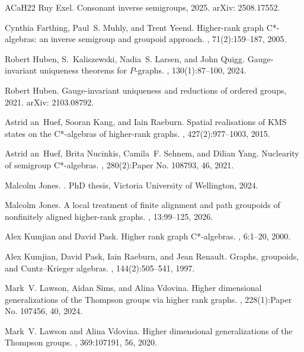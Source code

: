\documentclass[11pt]{amsart}
\theoremstyle{definition}
\numberwithin{thm}{section}
\numberwithin{equation}{section}
\begin{document}
\begin{thebibliography}{ACaH{\etalchar{+}}22}
Ruy Exel.
\newblock Consonant inverse semigroups, 2025.
\newblock arXiv: 2508.17552.

Cynthia Farthing, Paul~S. Muhly, and Trent Yeend.
\newblock Higher-rank graph {C}*-algebras: an inverse semigroup and groupoid approach.
, 71(2):159--187, 2005.

Robert Huben, S.~Kaliszewski, Nadia~S. Larsen, and John Quigg.
\newblock Gauge-invariant uniqueness theorems for {$P$}-graphs.
, 130(1):87--100, 2024.

Robert Huben.
\newblock Gauge-invariant uniqueness and reductions of ordered groups, 2021.
\newblock arXiv: 2103.08792.

Astrid an~Huef, Sooran Kang, and Iain Raeburn.
\newblock Spatial realisations of {KMS} states on the {C}*-algebras of higher-rank graphs.
, 427(2):977--1003, 2015.

Astrid an~Huef, Brita Nucinkis, Camila~F. Sehnem, and Dilian Yang.
\newblock Nuclearity of semigroup {C}*-algebras.
, 280(2):Paper No. 108793, 46, 2021.

Malcolm Jones.
.
\newblock PhD thesis, Victoria University of Wellington, 2024.

Malcolm Jones.
\newblock A local treatment of finite alignment and path groupoids of nonfinitely aligned higher-rank graphs.
, 13:99--125, 2026.

Alex Kumjian and David Pask.
\newblock Higher rank graph {C}*-algebras.
, 6:1--20, 2000.

Alex Kumjian, David Pask, Iain Raeburn, and Jean Renault.
\newblock Graphs, groupoids, and {C}untz--{K}rieger algebras.
, 144(2):505--541, 1997.

Mark~V. Lawson, Aidan Sims, and Alina Vdovina.
\newblock Higher dimensional generalizations of the {T}hompson groups via higher rank graphs.
, 228(1):Paper No. 107456, 40, 2024.

Mark~V. Lawson and Alina Vdovina.
\newblock Higher dimensional generalizations of the {T}hompson groups.
, 369:107191, 56, 2020.


\end{thebibliography}
\end{document}
